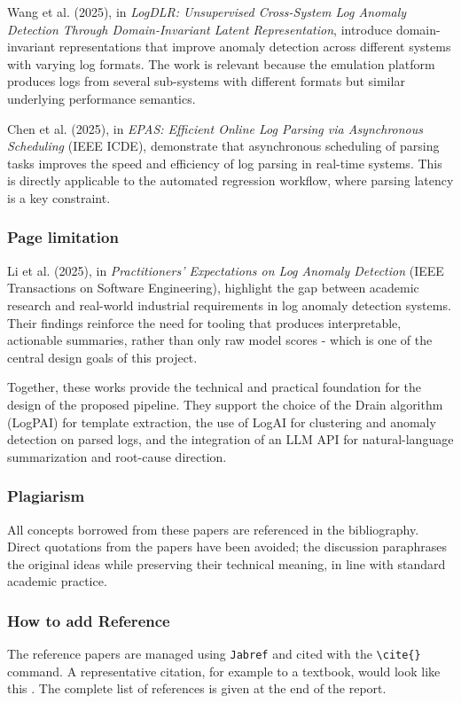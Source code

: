 Wang et al. (2025), in \textit{LogDLR: Unsupervised Cross-System Log Anomaly Detection Through Domain-Invariant Latent Representation}, introduce domain-invariant representations that improve anomaly detection across different systems with varying log formats. The work is relevant because the emulation platform produces logs from several sub-systems with different formats but similar underlying performance semantics.

Chen et al. (2025), in \textit{EPAS: Efficient Online Log Parsing via Asynchronous Scheduling} (IEEE ICDE), demonstrate that asynchronous scheduling of parsing tasks improves the speed and efficiency of log parsing in real-time systems. This is directly applicable to the automated regression workflow, where parsing latency is a key constraint.

\subsubsection{\textbf{Page limitation}}

Li et al. (2025), in \textit{Practitioners' Expectations on Log Anomaly Detection} (IEEE Transactions on Software Engineering), highlight the gap between academic research and real-world industrial requirements in log anomaly detection systems. Their findings reinforce the need for tooling that produces interpretable, actionable summaries, rather than only raw model scores - which is one of the central design goals of this project.

Together, these works provide the technical and practical foundation for the design of the proposed pipeline. They support the choice of the Drain algorithm (LogPAI) for template extraction, the use of LogAI for clustering and anomaly detection on parsed logs, and the integration of an LLM API for natural-language summarization and root-cause direction.

\subsubsection{\textbf{Plagiarism}}

All concepts borrowed from these papers are referenced in the bibliography. Direct quotations from the papers have been avoided; the discussion paraphrases the original ideas while preserving their technical meaning, in line with standard academic practice.

\subsubsection{How to add Reference}
The reference papers are managed using \texttt{Jabref} and cited with the \verb|\cite{}| command. A representative citation, for example to a textbook, would look like this \cite{Razavi2000}. The complete list of references is given at the end of the report.

